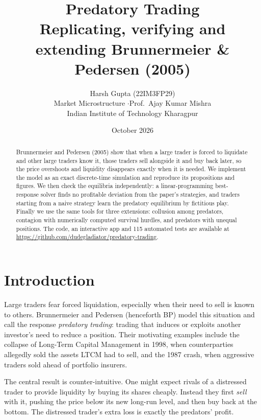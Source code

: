\documentclass[11pt,a4paper]{article}
\title{\textbf{Predatory Trading}\\[0.3em]
  \large Replicating, verifying and extending Brunnermeier \& Pedersen (2005)}
\author{Harsh Gupta \quad (22IM3FP29)\\[0.3em]
  \small Market Microstructure \quad$\cdot$\quad Prof.\ Ajay Kumar Mishra\\
  \small Indian Institute of Technology Kharagpur}
\date{October 2026}
\begin{document}
\maketitle

\begin{abstract}
\noindent
Brunnermeier and Pedersen (2005) show that when a large trader is forced to liquidate and
other large traders know it, those traders sell alongside it and buy back later, so the
price overshoots and liquidity disappears exactly when it is needed. We implement the model
as an exact discrete-time simulation and reproduce its propositions and figures. We then
check the equilibria independently: a linear-programming best-response solver finds no
profitable deviation from the paper's strategies, and traders starting from a naive
strategy learn the predatory equilibrium by fictitious play. Finally we use the same tools
for three extensions: collusion among predators, contagion with numerically computed
survival hurdles, and predators with unequal positions. The code, an interactive app and
115 automated tests are available at \url{https://github.com/dudegladiator/predatory-trading}.
\end{abstract}

\section{Introduction}

Large traders fear forced liquidation, especially when their need to sell is known to
others. Brunnermeier and Pedersen \cite{bp2005} (henceforth BP) model this situation and
call the response \emph{predatory trading}: trading that induces or exploits another
investor's need to reduce a position. Their motivating examples include the collapse of
Long-Term Capital Management in 1998, when counterparties allegedly sold the assets LTCM
had to sell, and the 1987 crash, when aggressive traders sold ahead of portfolio insurers.

The central result is counter-intuitive. One might expect rivals of a distressed trader to
provide liquidity by buying its shares cheaply. Instead they first \emph{sell} with it,
pushing the price below its new long-run level, and then buy back at the bottom. The
distressed trader's extra loss is exactly the predators' profit.
\end{document}
